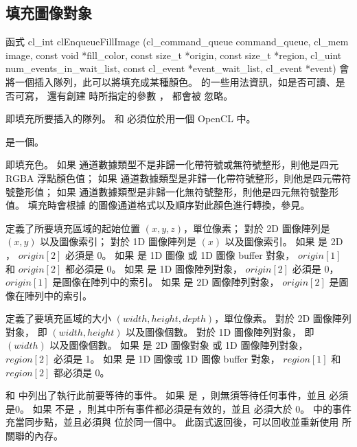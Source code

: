 \subsection{填充圖像對象}

函式
\startCLFUNC
cl_int clEnqueueFillImage (cl_command_queue command_queue,
			cl_mem image,
			const void *fill_color,
			const size_t *origin,
			const size_t *region,
			cl_uint num_events_in_wait_list,
			const cl_event *event_wait_list,
			cl_event *event)
\stopCLFUNC
會將一個插入隊列，此可以將填充成某種顏色。
  的一些用法資訊，如是否可讀、是否可寫，
還有創建  時所指定的參數 ，
都會被  忽略。

 即填充所要插入的隊列。
 和  必須位於用一個 OpenCL 中。

 是一個。

 即填充色。
如果  通道數據類型不是非歸一化帶符號或無符號整形，則他是四元 RGBA 浮點顏色值；
如果  通道數據類型是非歸一化帶符號整形，則他是四元帶符號整形值；
如果  通道數據類型是非歸一化無符號整形，則他是四元無符號整形值。
填充時會根據  的圖像通道格式以及順序對此顏色進行轉換，參見。

 定義了所要填充區域的起始位置 $(x, y, z)$，單位像素；
對於 2D 圖像陣列是 $(x, y)$ 以及圖像索引；
對於 1D 圖像陣列是 $(x)$ 以及圖像索引。
如果  是 2D ， $origin[2]$ 必須是 0。
如果  是 1D 圖像 或 1D 圖像 buffer 對象， $origin[1]$ 和 $origin[2]$ 都必須是 0。
如果  是 1D 圖像陣列對象， $origin[2]$ 必須是 0， $origin[1]$ 是圖像在陣列中的索引。
如果  是 2D 圖像陣列對象， $origin[2]$ 是圖像在陣列中的索引。

 定義了要填充區域的大小 $(width, height, depth)$，單位像素。
對於 2D 圖像陣列對象， 即 $(width, height)$ 以及圖像個數。
對於 1D 圖像陣列對象， 即 $(width)$ 以及圖像個數。
如果  是 2D 圖像對象 或 1D 圖像陣列對象， $region[2]$ 必須是 1。
如果  是 1D 圖像或 1D 圖像 buffer 對象， $region[1]$ 和 $region[2]$ 都必須是 0。

 和  中列出了執行此前要等待的事件。
如果  是 ，則無須等待任何事件，並且  必須是0。
如果  不是 ，則其中所有事件都必須是有效的，並且  必須大於 0。
 中的事件充當同步點，並且必須與  位於同一個中。
此函式返回後，可以回收並重新使用  所關聯的內存。

